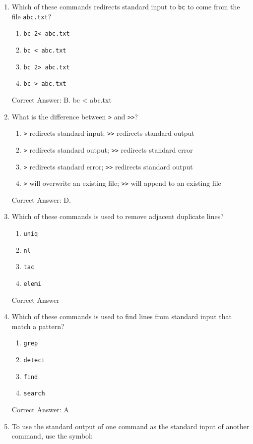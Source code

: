 \documentclass{article}
\begin{document}
\begin{enumerate}
    \item Which of these commands redirects standard input to \texttt{bc} to come from the file \texttt{abc.txt}?
    \begin{enumerate}
        \item \texttt{bc 2< abc.txt}
        \item \texttt{bc < abc.txt}
        \item \texttt{bc 2> abc.txt}
        \item \texttt{bc > abc.txt}
    \end{enumerate}
    Correct Answer: B. bc <  abc.txt
    \item What is the difference between \texttt{>} and \texttt{>>}?
    \begin{enumerate}
        \item \texttt{>} redirects standard input; \texttt{>>} redirects standard output
        \item \texttt{>} redirects standard output; \texttt{>>} redirects standard error
        \item \texttt{>} redirects standard error; \texttt{>>} redirects standard output
        \item \texttt{>} will overwrite an existing file; \texttt{>>} will append to an existing file
    \end{enumerate}
    Correct Answer: D.
    \item Which of these commands is used to remove adjacent duplicate lines?
    \begin{enumerate}
        \item \texttt{uniq}
        \item \texttt{nl}
        \item \texttt{tac}
        \item \texttt{elemi}
    \end{enumerate}
    Correct Answer
    \item Which of these commands is used to find lines from standard input that match a pattern?
    \begin{enumerate}
        \item \texttt{grep}
        \item \texttt{detect}
        \item \texttt{find}
        \item \texttt{search}
    \end{enumerate}
    Correct Answer: A
    \item To use the standard output of one command as the standard input of another command, use the symbol:

\end{enumerate}
\end{document}
